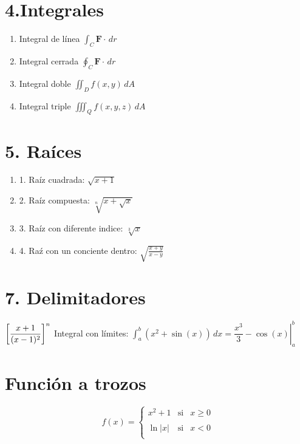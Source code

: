 \documentclass{article} %
\begin{document}
\section*{4.Integrales}
\begin{enumerate}
\setlength\itemsep{1cm}
\item Integral de l\'inea $\displaystyle{\int_C\boldsymbol{F}\cdot\, dr}$

\item Integral cerrada $ \displaystyle{\oint_C\pmb{F}\cdot\, dr} $

\item Integral doble $\displaystyle{{\iint_D f(x,y)\,dA}}$

\item Integral triple $\displaystyle{{\iiint_Q f(x,y,z)\,dA}}$
\end{enumerate}
\section*{5. Ra\'ices}
\begin{enumerate}
\setlength\itemsep{1cm}
\item 1. Ra\'iz cuadrada: $\sqrt{x+1}$

\item 2. Ra\'iz compuesta: $ \displaystyle{ \sqrt[n]{x+\sqrt{x}} }$

\item 3. Ra\'iz con diferente indice: $\sqrt[3]{x}$

\item 4. Ra\'z con un conciente dentro: $\sqrt{\frac{x+y}{x-y}}$
\end{enumerate}

\section*{7. Delimitadores}
$\displaystyle \left[{x+1 \over (x-1)^2} \right]^n$
\newline
Integral con límites: $\int_{a}^{b} \left(x^2+\sin (x)\right)\, dx = \left.
\dfrac{x^3}{3}-\cos (x)\right|_{a}^{b}$

\section*{Funci\'on a trozos}
\[f(x)=\left\{ \begin{array}{rcl}
    x^2+1 & \mbox{si} & x\geq 0\\
    & & \\
    \ln|x| & \mbox{si} & x< 0\\
    \end{array}
\right. \] %
    
\end{document}
